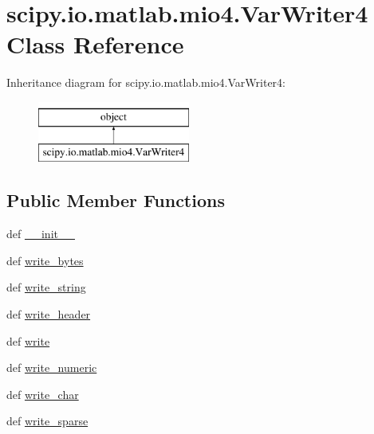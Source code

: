 \hypertarget{classscipy_1_1io_1_1matlab_1_1mio4_1_1VarWriter4}{}\section{scipy.\+io.\+matlab.\+mio4.\+Var\+Writer4 Class Reference}
\label{classscipy_1_1io_1_1matlab_1_1mio4_1_1VarWriter4}
Inheritance diagram for scipy.\+io.\+matlab.\+mio4.\+Var\+Writer4\+:\begin{figure}[H]
\begin{center}
\leavevmode
\includegraphics[height=2.000000cm]{classscipy_1_1io_1_1matlab_1_1mio4_1_1VarWriter4}
\end{center}
\end{figure}
\subsection*{Public Member Functions}
\begin{DoxyCompactItemize}
\item 
def \hyperlink{classscipy_1_1io_1_1matlab_1_1mio4_1_1VarWriter4_a14b911bc7e14aed089d384db090e0f92}{\+\_\+\+\_\+init\+\_\+\+\_\+}
\item 
def \hyperlink{classscipy_1_1io_1_1matlab_1_1mio4_1_1VarWriter4_aac25a679a66894b18a1017a7ae4d0a1c}{write\+\_\+bytes}
\item 
def \hyperlink{classscipy_1_1io_1_1matlab_1_1mio4_1_1VarWriter4_aec6de24619306b5dc83cf975f389cf54}{write\+\_\+string}
\item 
def \hyperlink{classscipy_1_1io_1_1matlab_1_1mio4_1_1VarWriter4_a297cfd4f5df48f0601e2d7208fd41293}{write\+\_\+header}
\item 
def \hyperlink{classscipy_1_1io_1_1matlab_1_1mio4_1_1VarWriter4_a0ec42b8c032d2bc771b343731ace72d5}{write}
\item 
def \hyperlink{classscipy_1_1io_1_1matlab_1_1mio4_1_1VarWriter4_ad0301cb8a7a2ac08ab6f1dbd5e45a7b6}{write\+\_\+numeric}
\item 
def \hyperlink{classscipy_1_1io_1_1matlab_1_1mio4_1_1VarWriter4_a38bf74758f9746a7ed41dda6ab3c9f8a}{write\+\_\+char}
\item 
def \hyperlink{classscipy_1_1io_1_1matlab_1_1mio4_1_1VarWriter4_a0f93405bcec9a45bad9dc53c4e4fa072}{write\+\_\+sparse}
\end{DoxyCompactItemize}
